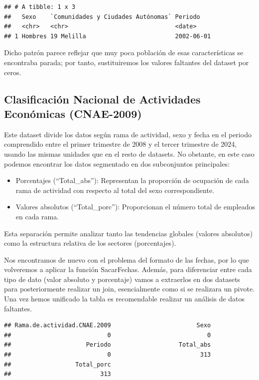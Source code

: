 \documentclass[notspecified,article,submit,moreauthors,pdftex]{Definitions/mdpi}
\begin{document}
\begin{verbatim}
## # A tibble: 1 x 3
##   Sexo    `Comunidades y Ciudades Autónomas` Periodo   
##   <chr>   <chr>                              <date>    
## 1 Hombres 19 Melilla                         2002-06-01
\end{verbatim}

Dicho patrón parece reflejar que muy poca población de esas
características se encontraba parada; por tanto, sustituiremos los
valores faltantes del dataset por ceros.

\subsection{Clasificación Nacional de Actividades Económicas
(CNAE-2009)}\label{clasificaciuxf3n-nacional-de-actividades-econuxf3micas-cnae-2009}

Este dataset divide los datos según rama de actividad, sexo y fecha en
el periodo comprendido entre el primer trimestre de 2008 y el tercer
trimestre de 2024, usando las mismas unidades que en el resto de
datasets. No obstante, en este caso podemos encontrar los datos
segmentado en dos subconjuntos principales:

\begin{itemize}
\item
  Porcentajes (``Total\_abs''): Representan la proporción de ocupación
  de cada rama de actividad con respecto al total del sexo
  correspondiente.
\item
  Valores absolutos (``Total\_porc''): Proporcionan el número total de
  empleados en cada rama.
\end{itemize}

Esta separación permite analizar tanto las tendencias globales (valores
absolutos) como la estructura relativa de los sectores (porcentajes).

Nos encontramos de nuevo con el problema del formato de las fechas, por
lo que volveremos a aplicar la función SacarFechas. Además, para
diferenciar entre cada tipo de dato (valor absoluto y porcentaje) vamos
a extraerlos en dos datasets para posteriormente realizar un join,
esencialmente como si se realizara un pivote. Una vez hemos unificado la
tabla es recomendable realizar un análisis de datos faltantes.

\begin{verbatim}
## Rama.de.actividad.CNAE.2009                        Sexo 
##                           0                           0 
##                     Periodo                   Total_abs 
##                           0                         313 
##                  Total_porc 
##                         313
\end{verbatim}
\end{document}
